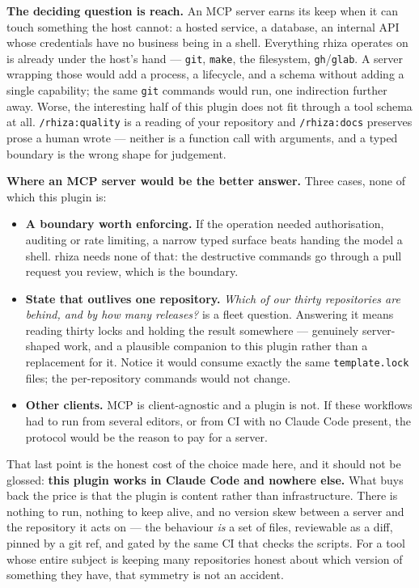 \documentclass[11pt,a4paper]{article}
\newcommand{\cmd}[1]{\texttt{/rhiza:#1}}
\newcommand{\file}[1]{\texttt{#1}}
\begin{document}
\noindent
\textbf{The deciding question is reach.} An MCP server earns its keep when it can touch
something the host cannot: a hosted service, a database, an internal API whose
credentials have no business being in a shell. Everything rhiza operates on is already
under the host's hand --- \texttt{git}, \texttt{make}, the filesystem,
\texttt{gh}/\texttt{glab}. A server wrapping those would add a process, a lifecycle, and
a schema without adding a single capability; the same \texttt{git} commands would run,
one indirection further away. Worse, the interesting half of this plugin does not fit
through a tool schema at all. \cmd{quality} is a reading of your repository and
\cmd{docs} preserves prose a human wrote --- neither is a function call with arguments,
and a typed boundary is the wrong shape for judgement.

\medskip
\noindent
\textbf{Where an MCP server would be the better answer.} Three cases, none of which this
plugin is:

\begin{itemize}[leftmargin=1.4em, itemsep=0.3em]
  \item \textbf{A boundary worth enforcing.} If the operation needed authorisation,
        auditing or rate limiting, a narrow typed surface beats handing the model a
        shell. rhiza needs none of that: the destructive commands go through a pull
        request you review, which is the boundary.
  \item \textbf{State that outlives one repository.} \emph{Which of our thirty
        repositories are behind, and by how many releases?} is a fleet question. Answering
        it means reading thirty locks and holding the result somewhere --- genuinely
        server-shaped work, and a plausible companion to this plugin rather than a
        replacement for it. Notice it would consume exactly the same
        \file{template.lock} files; the per-repository commands would not change.
  \item \textbf{Other clients.} MCP is client-agnostic and a plugin is not. If these
        workflows had to run from several editors, or from CI with no Claude Code present,
        the protocol would be the reason to pay for a server.
\end{itemize}

\noindent
That last point is the honest cost of the choice made here, and it should not be
glossed: \textbf{this plugin works in Claude Code and nowhere else.} What buys back the
price is that the plugin is content rather than infrastructure. There is nothing to run,
nothing to keep alive, and no version skew between a server and the repository it acts
on --- the behaviour \emph{is} a set of files, reviewable as a diff, pinned by a git ref,
and gated by the same CI that checks the scripts. For a tool whose entire subject is
keeping many repositories honest about which version of something they have, that
symmetry is not an accident.
\end{document}
